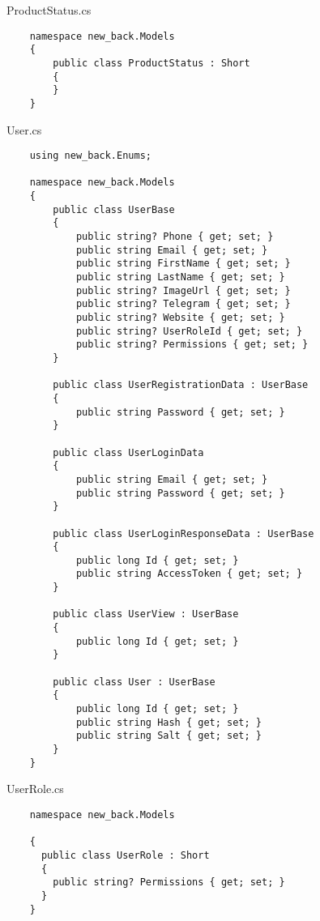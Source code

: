 ProductStatus.cs
\lstset{style=sharpc}
\begin{lstlisting}
    namespace new_back.Models
    {
        public class ProductStatus : Short
        {
        }
    }
\end{lstlisting}

User.cs
\lstset{style=sharpc}
\begin{lstlisting}
    using new_back.Enums;

    namespace new_back.Models
    {
        public class UserBase
        {
            public string? Phone { get; set; }
            public string Email { get; set; }
            public string FirstName { get; set; }
            public string LastName { get; set; }
            public string? ImageUrl { get; set; }
            public string? Telegram { get; set; }
            public string? Website { get; set; }
            public string? UserRoleId { get; set; }
            public string? Permissions { get; set; }
        }
        
        public class UserRegistrationData : UserBase
        {
            public string Password { get; set; }
        }
    
        public class UserLoginData
        {
            public string Email { get; set; }
            public string Password { get; set; }
        }
        
        public class UserLoginResponseData : UserBase
        {
            public long Id { get; set; }
            public string AccessToken { get; set; }
        }
        
        public class UserView : UserBase
        {
            public long Id { get; set; }
        }
        
        public class User : UserBase
        {
            public long Id { get; set; }
            public string Hash { get; set; }
            public string Salt { get; set; }
        }
    }    
\end{lstlisting}

UserRole.cs
\lstset{style=sharpc}
\begin{lstlisting}
    namespace new_back.Models

    {
      public class UserRole : Short
      {
        public string? Permissions { get; set; }
      }
    }
\end{lstlisting}

